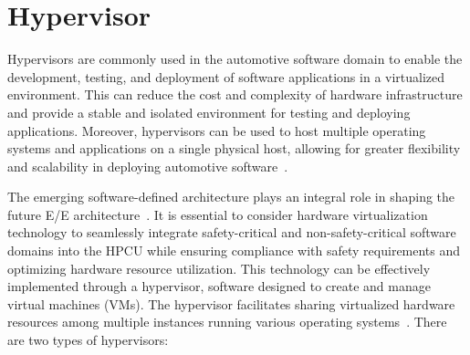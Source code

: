      \section{Hypervisor}
 

    Hypervisors are commonly used in the automotive software domain to enable the development, testing, and deployment of software applications in a virtualized environment. This can reduce the cost and complexity of hardware infrastructure and provide a stable and isolated environment for testing and deploying applications. Moreover, hypervisors can be used to host multiple operating systems and applications on a single physical host, allowing for greater flexibility and scalability in deploying automotive software~\cite{9968908}.

    The emerging software-defined architecture plays an integral role in shaping the future E/E architecture~\cite{askaripoor2022architecture}. It is essential to consider hardware virtualization technology to seamlessly integrate safety-critical and non-safety-critical software domains into the HPCU while ensuring compliance with safety requirements and optimizing hardware resource utilization. This technology can be effectively implemented through a hypervisor, software designed to create and manage virtual machines (VMs). The hypervisor facilitates sharing virtualized hardware resources among multiple instances running various operating systems~\cite{askaripoor2022architecture,9968908}.
    There are two types of hypervisors:
   
